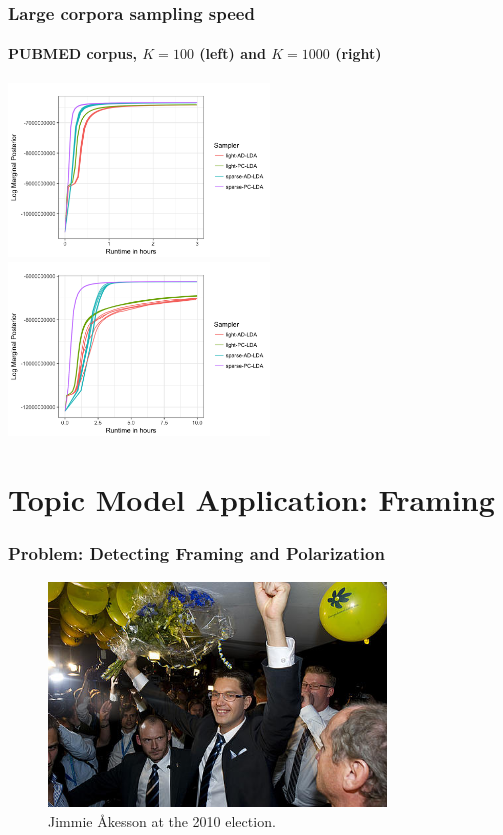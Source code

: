 \documentclass[compress]{beamer}
\begin{document}
\begin{frame}
\frametitle{Large corpora sampling speed}
\framesubtitle{PUBMED corpus, $K=100$ (left) and $K=1000$ (right)}

\includegraphics[width=0.52\textwidth]{magnusson/pubmed_algo-pubmed-100.png}\includegraphics[width=0.52\textwidth]{magnusson/pubmed_algo-pubmed-1000.png}


\end{frame}

\section{Topic Model Application: Framing}

\begin{frame}
\frametitle{Problem: Detecting Framing and Polarization}

\begin{figure}
    \centering
    \includegraphics[width=0.8\textwidth]{magnusson/jimmie2010.jpg}
    \caption{Jimmie \r{A}kesson at the 2010 election.}
\end{figure}



\end{frame}
\end{document}
